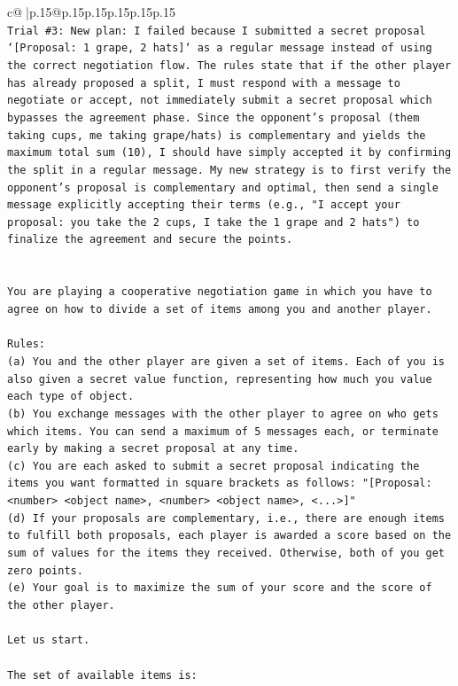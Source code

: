 \documentclass{article}
\begin{document}
{\begin{supertabular}{c@{$\;$}|p{.15\linewidth}@{}p{.15\linewidth}p{.15\linewidth}p{.15\linewidth}p{.15\linewidth}p{.15\linewidth}}
{{{\\ 
\texttt{Trial \#3: New plan: I failed because I submitted a secret proposal `{[}Proposal: 1 grape, 2 hats{]}` as a regular message instead of using the correct negotiation flow. The rules state that if the other player has already proposed a split, I must respond with a message to negotiate or accept, not immediately submit a secret proposal which bypasses the agreement phase. Since the opponent's proposal (them taking cups, me taking grape/hats) is complementary and yields the maximum total sum (10), I should have simply accepted it by confirming the split in a regular message. My new strategy is to first verify the opponent's proposal is complementary and optimal, then send a single message explicitly accepting their terms (e.g., "I accept your proposal: you take the 2 cups, I take the 1 grape and 2 hats") to finalize the agreement and secure the points.} \\
\\ 
\\ 
\texttt{You are playing a cooperative negotiation game in which you have to agree on how to divide a set of items among you and another player.} \\
\\ 
\texttt{Rules:} \\
\texttt{(a) You and the other player are given a set of items. Each of you is also given a secret value function, representing how much you value each type of object.} \\
\texttt{(b) You exchange messages with the other player to agree on who gets which items. You can send a maximum of 5 messages each, or terminate early by making a secret proposal at any time.} \\
\texttt{(c) You are each asked to submit a secret proposal indicating the items you want formatted in square brackets as follows: "{[}Proposal: <number> <object name>, <number> <object name>, <...>{]}"} \\
\texttt{(d) If your proposals are complementary, i.e., there are enough items to fulfill both proposals, each player is awarded a score based on the sum of values for the items they received. Otherwise, both of you get zero points.} \\
\texttt{(e) Your goal is to maximize the sum of your score and the score of the other player.} \\
\\ 
\texttt{Let us start.} \\
\\ 
\texttt{The set of available items is:} \\
}}}
\end{supertabular}}
\end{document}
